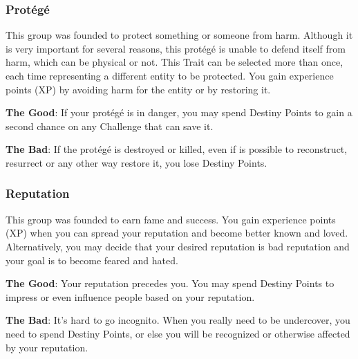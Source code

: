 \begin{multicols}{2}
\subsubsection{Prot\'eg\'e}
This group was founded to protect something or someone from harm. Although it is very important for several reasons, this protégé is unable to defend itself from harm, which can be physical or not. This Trait can be selected more than once, each time representing a different entity to be protected. You gain experience points (XP) by avoiding harm for the entity or by restoring it.

\textbf{The Good}: If your prot\'eg\'e is in danger, you may spend Destiny Points to gain a second chance on any Challenge that can save it.

\textbf{The Bad}: If the protégé is destroyed or killed, even if is possible to reconstruct, resurrect or any other way restore it, you lose Destiny Points.

\subsubsection{Reputation}
This group was founded to earn fame and success. You gain experience points (XP) when you can spread your reputation and become better known and loved. Alternatively, you may decide that your desired reputation is bad reputation and your goal is to become feared and hated.

\textbf{The Good}: Your reputation precedes you. You may spend Destiny Points to impress or even influence people based on your reputation.

\textbf{The Bad}: It's hard to go incognito. When you really need to be undercover, you need to spend Destiny Points, or else you will be recognized or otherwise affected by your reputation.
\end{multicols}

